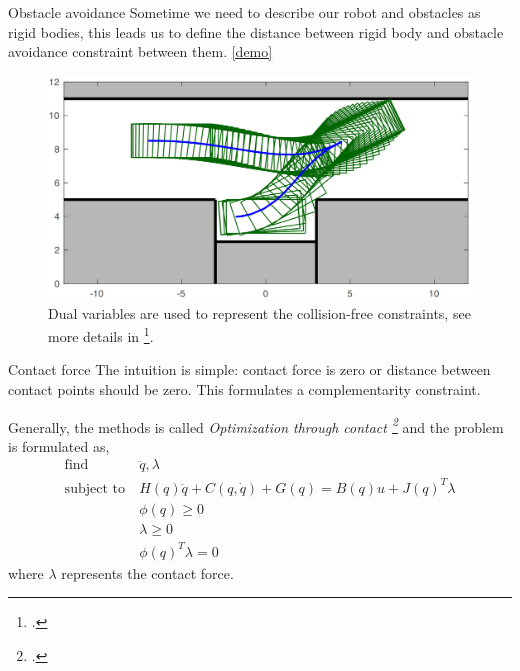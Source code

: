 \documentclass{beamer}
\begin{document}
\begin{frame}{Obstacle avoidance}
	Sometime we need to describe our robot and obstacles as rigid bodies, this leads us to define the distance between rigid body and obstacle avoidance constraint between them. \href{https://raw.githubusercontent.com/XiaojingGeorgeZhang/OBCA/master/images/TrajBack_ParkingVideo.gif}{[demo]}
	\begin{figure}
		\includegraphics[width=0.5\linewidth]{figures/parallel-parking.png}
		\caption{Dual variables are used to represent the collision-free constraints, see more details in \footcite{zhang2017optimization}.}
	\end{figure}
\end{frame}

\begin{frame}{Contact force}
	The intuition is simple: contact force is zero or distance between contact points should be zero. This formulates a complementarity constraint.
	
	\vspace{\baselineskip}
	Generally, the methods is called \emph{Optimization through contact \footcite{posa2014direct}} and the problem is formulated as,
	\begin{align*}
		\text{find} \ & \ddot{q}, \lambda \\
		\text{subject to} \ & H(q) \ddot{q} + C(q, \dot{q}) + G(q) = B(q) u + J(q)^T \lambda \\
		& \phi(q) \geq 0 \\
		& \lambda \geq 0 \\
		& \phi(q)^T \lambda  = 0
	\end{align*}
	where $\lambda$ represents the contact force.
\end{frame}
\end{document}
